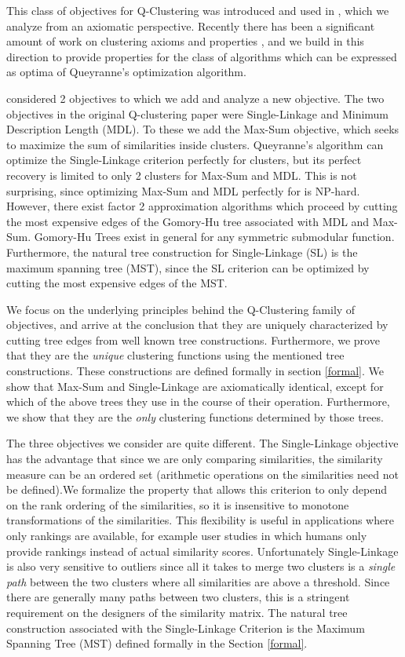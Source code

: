 \documentclass[twoside,11pt]{article}
\begin{document}
This class of objectives for Q-Clustering was introduced and used in \cite{qclustering}, which we analyze from an axiomatic perspective. Recently there has been a significant amount of work on clustering axioms and properties \citep{rita,bosagh2009,gunnar}, 
and we build in this direction to provide properties for the class of algorithms which can be expressed as optima of
Queyranne's optimization algorithm.


\cite{qclustering} considered 2 objectives to which we add and analyze a new objective. The two objectives
in the original Q-clustering paper were Single-Linkage and Minimum Description Length (MDL).
To these we add the Max-Sum objective, which seeks to maximize the sum of similarities inside clusters. 
Queyranne's algorithm can optimize the Single-Linkage criterion perfectly for  clusters, but its
perfect recovery is limited to only 2 clusters for Max-Sum and MDL. This is not surprising, since optimizing
Max-Sum and MDL perfectly for  is NP-hard. However, there exist factor 2 approximation algorithms
which proceed by cutting the  most expensive edges of the Gomory-Hu tree \citep{gomoryhu} associated with 
MDL and Max-Sum. Gomory-Hu Trees exist in general for any symmetric submodular function. Furthermore, the
natural tree construction for Single-Linkage (SL) is the maximum spanning tree (MST), since the SL criterion
can be optimized by cutting the  most expensive edges of the MST.

We focus on the underlying principles behind the Q-Clustering family of objectives, and arrive at the conclusion that
they are uniquely characterized by cutting tree edges from well known tree constructions. Furthermore, we prove that
they are the \textit{unique} clustering functions using the mentioned tree constructions. These constructions are defined formally in section \ref{formal}. We show that Max-Sum and Single-Linkage are axiomatically identical, except for which of the above trees they use in the course of their operation. Furthermore, we show that they are the \textit{only} clustering functions determined by those trees.

The three objectives we consider are quite different. The Single-Linkage objective has the advantage that since we are only comparing similarities,
the similarity measure can be an ordered set (arithmetic operations on the
similarities need not be defined).We formalize the property that allows this criterion to only depend 
on the rank ordering of the similarities, so it is
insensitive to monotone transformations of the similarities. This flexibility is useful in applications where only rankings
are available, for example user studies in which humans only provide rankings instead of actual similarity scores.
Unfortunately Single-Linkage is also very sensitive to outliers since all it takes to merge two clusters is a 
\textit{single path} between the two clusters where all similarities are above a threshold. Since there are generally many paths between
two clusters, this is a stringent requirement on the designers of the similarity matrix. The natural tree construction
associated with the Single-Linkage Criterion is the Maximum Spanning Tree (MST) defined formally in the Section \ref{formal}.
\end{document}
